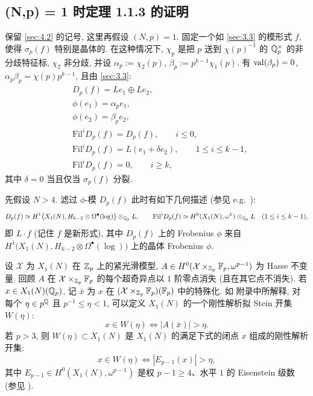 
\subsection{(N,p) = 1 时定理 1.1.3 的证明}\label{sec:4.3}

保留 \ref{sec:4.2} 的记号, 这里再假设 $(N,p) = 1$.
固定一个如 \ref{sec:3.3} 的模形式 $f$, 使得 $\sigma_p(f)$ 特别是晶体的.
在这种情况下, $\chi_p$ 是把 $p$ 送到 $\chi(p)^{-1}$ 的 $\mathbb{Q}_p^{\times}$ 的非分歧特征标, $\chi_2$ 非分歧, 并设 $\alpha_p := \chi_2(p)$, $\beta_p := p^{k-1}\chi_1(p)$.
有 $\operatorname{val}(\beta_p) = 0$, $\alpha_p\beta_p = \chi(p)p^{k-1}$, 且由 \ref{sec:3.3}:
\[
\begin{aligned}
&D_p(f) = Le_1 \oplus Le_2,\\
&\phi(e_1) = \alpha_p e_1,\\
&\phi(e_2) = \beta_p e_2,\\
&\mathrm{Fil}^{i}D_p(f) = D_p(f), \qquad i \le 0,\\
&\mathrm{Fil}^{i}D_p(f) = L(e_1 + \delta e_2), \qquad 1 \le i \le k-1,\\
&\mathrm{Fil}^{i}D_p(f) = 0, \qquad i \ge k,
\end{aligned}
\]
其中 $\delta = 0$ 当且仅当 $\sigma_p(f)$ 分裂.

先假设 $N > 4$.
滤过 $\phi$-模 $D_p(f)$ 此时有如下几何描述 (参见 e.g.\ \cite[\S1]{ref:29}):
\[
D_p(f) \simeq H^{1}\bigl(X_1(N),H_{k-2} \otimes \Omega^{\bullet}(\log)\bigr) \otimes_{\mathbb{Q}_p} L,
\qquad
\mathrm{Fil}^{i}D_p(f) \simeq H^{0}(X_1(N),\omega^{k}) \otimes_{\mathbb{Q}_p} L \quad (1 \le i \le k-1),
\]
即 $L \cdot f$ (记住 $f$ 是新形式), 其中 $D_p(f)$ 上的 Frobenius $\phi$ 来自 $H^{1}\bigl(X_1(N),H_{k-2} \otimes \Omega^{\bullet}(\log)\bigr)$ 上的晶体 Frobenius $\phi$.

设 $\mathcal{X}$ 为 $X_1(N)$ 在 $\mathbb{Z}_p$ 上的紧光滑模型, $A \in H^{0}(\mathcal{X} \times_{\mathbb{Z}_p} \mathbb{F}_p,\omega^{p-1})$ 为 Hasse 不变量.
回顾 $A$ 在 $\mathcal{X} \times_{\mathbb{Z}_p} \mathbb{F}_p$ 的每个超奇异点以 $1$ 阶零点消失 (且在其它点不消失).
若 $x \in X_1(N)(\mathbb{Q}_p)$, 记 $\bar{x}$ 为 $x$ 在 $(\mathcal{X} \times_{\mathbb{Z}_p} \mathbb{F}_p)(\mathbb{F}_p)$ 中的特殊化.
如 \cite{ref:10} 附录中所解释, 对每个 $\eta \in p^{\mathbb{Q}}$ 且 $p^{-1} \le \eta < 1$, 可以定义 $X_1(N)$ 的一个刚性解析拟 Stein 开集 $W(\eta)$:
\[
x \in W(\eta) \iff |A(\bar{x})| > \eta.
\]
若 $p > 3$, 则 $W(\eta) \subset X_1(N)$ 是 $X_1(N)$ 的满足下式的闭点 $x$ 组成的刚性解析开集:
\[
x \in W(\eta) \iff |E_{p-1}(x)| > \eta,
\]
其中 $E_{p-1} \in H^{0}(X_1(N),\omega^{p-1})$ 是权 $p-1 \ge 4$、水平 $1$ 的 Eisenstein 级数 (参见 \cite[\S1 和 \S2]{ref:13}).

